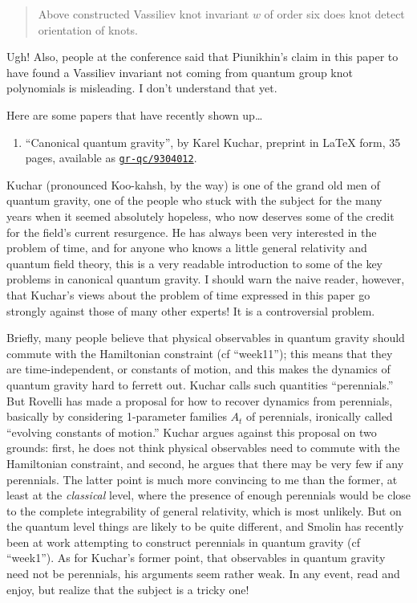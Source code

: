 \documentclass{article}
\def\tightlist{}
\begin{document}
\begin{quote}
Above constructed Vassiliev knot invariant \(w\) of order six does knot
detect orientation of knots.
\end{quote}

Ugh! Also, people at the conference said that Piunikhin's claim in this
paper to have found a Vassiliev invariant not coming from quantum group
knot polynomials is misleading. I don't understand that yet.

Here are some papers that have recently shown up\ldots{}

\begin{enumerate}
\def\labelenumi{\arabic{enumi})}
\tightlist
\item
  ``Canonical quantum gravity'', by Karel Kuchar, preprint in LaTeX
  form, 35 pages, available as
  \href{http://xxx.lanl.gov/abs/gr-qc/9304012}{\texttt{gr-qc/9304012}}.
\end{enumerate}

Kuchar (pronounced Koo-kahsh, by the way) is one of the grand old men of
quantum gravity, one of the people who stuck with the subject for the
many years when it seemed absolutely hopeless, who now deserves some of
the credit for the field's current resurgence. He has always been very
interested in the problem of time, and for anyone who knows a little
general relativity and quantum field theory, this is a very readable
introduction to some of the key problems in canonical quantum gravity. I
should warn the naive reader, however, that Kuchar's views about the
problem of time expressed in this paper go strongly against those of
many other experts! It is a controversial problem.

Briefly, many people believe that physical observables in quantum
gravity should commute with the Hamiltonian constraint (cf ``week11'');
this means that they are time-independent, or constants of motion, and
this makes the dynamics of quantum gravity hard to ferrett out. Kuchar
calls such quantities ``perennials.'' But Rovelli has made a proposal
for how to recover dynamics from perennials, basically by considering
1-parameter families \(A_t\) of perennials, ironically called ``evolving
constants of motion.'' Kuchar argues against this proposal on two
grounds: first, he does not think physical observables need to commute
with the Hamiltonian constraint, and second, he argues that there may be
very few if any perennials. The latter point is much more convincing to
me than the former, at least at the \emph{classical} level, where the
presence of enough perennials would be close to the complete
integrability of general relativity, which is most unlikely. But on the
quantum level things are likely to be quite different, and Smolin has
recently been at work attempting to construct perennials in quantum
gravity (cf ``week1''). As for Kuchar's former point, that observables
in quantum gravity need not be perennials, his arguments seem rather
weak. In any event, read and enjoy, but realize that the subject is a
tricky one!
\end{document}
